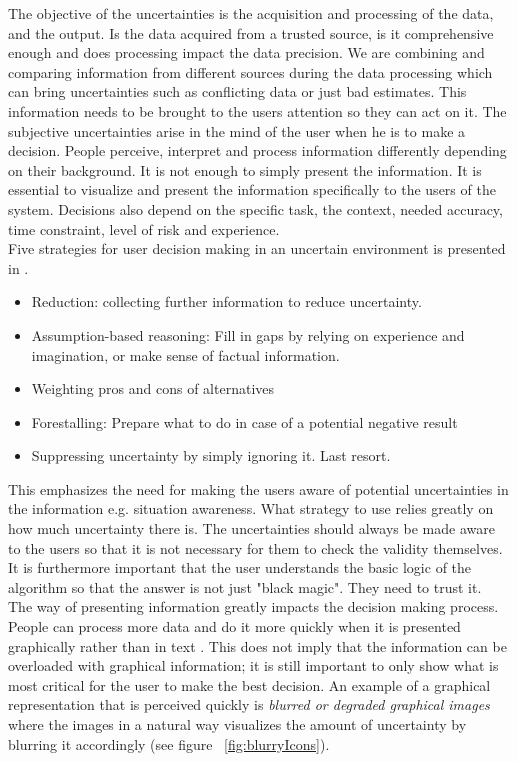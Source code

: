 The objective of the uncertainties is the acquisition and processing of the data, and the output. Is the data acquired from a trusted source, is it comprehensive enough and does processing impact the data precision. We are combining and comparing information from different sources during the data processing which can bring uncertainties such as conflicting data or just bad estimates. This information needs to be brought to the users attention so they can act on it. The subjective uncertainties arise in the mind of the user when he is to make a decision. People perceive, interpret and process information differently depending on their background. It is not enough to simply present the information. It is essential to visualize and present the information specifically to the users of the system. Decisions also depend on the specific task, the context, needed accuracy, time constraint, level of risk and experience. 
\\[0.5cm]
Five strategies for user decision making in an uncertain environment is presented in \cite{UncertainInformation}. 
\begin{itemize}
\item Reduction: collecting further information to reduce uncertainty.
\item Assumption-based reasoning: Fill in gaps by relying on experience and imagination, or make sense of factual information.
\item Weighting pros and cons of alternatives
\item Forestalling: Prepare what to do in case of a potential negative result
\item Suppressing uncertainty by simply ignoring it. Last resort.
\end{itemize}  
This emphasizes the need for making the users aware of potential uncertainties in the information e.g. situation awareness. What strategy to use relies greatly on how much uncertainty there is. The uncertainties should always be made aware to the users so that it is not necessary for them to check the validity themselves. It is furthermore important that the user understands the basic logic of the algorithm so that the answer is not just "black magic". They need to trust it.
\\[0.5cm]
The way of presenting information greatly impacts the decision making process. People can process more data and do it more quickly when it is presented graphically rather than in text \cite{UncertainInformation}. This does not imply that the information can be overloaded with graphical information; it is still important to only show what is most critical for the user to make the best decision. An example of a graphical representation that is perceived quickly is \textit{blurred or degraded graphical images} where the images in a natural way visualizes the amount of uncertainty by blurring it accordingly (see figure ~\ref{fig:blurryIcons}). 
